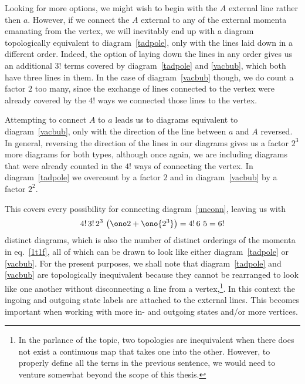 Looking for more options, we might wish to begin with the $A$ external line rather then $a$. However, if we connect the $A$ external to any of the external momenta emanating from the vertex, we will inevitably end up with a diagram topologically equivalent to diagram~\eqref{tadpole}, only with the lines laid down in a different order. Indeed, the option of laying down the lines in any order gives us an additional $3!$ terms covered by diagram~\eqref{tadpole} and \eqref{vacbub}, which both have three lines in them. In the case of diagram~\eqref{vacbub} though, we do count a factor $2$ too many, since the exchange of lines connected to the vertex were already covered by the $4!$ ways we connected those lines to the vertex.

Attempting to connect $A$ to $a$ leads us to diagrams equivalent to diagram~\eqref{vacbub}, only with the direction of the line between $a$ and $A$ reversed. In general, reversing the direction of the lines in our diagrams gives us a factor $2^3$ more diagrams for both types, although once again, we are including diagrams that were already counted in the $4!$ ways of connecting the vertex. In diagram~\eqref{tadpole} we overcount by a factor $2$ and in diagram~\eqref{vacbub} by a factor $2^2$.

This covers every possibility for connecting diagram~\eqref{unconn}, leaving us with
\[4!\,3!\,2^3\,\left(\ono2+\ono{2^3}\right)=4!\,6\,\,5=6!\]
distinct diagrams, which is also the number of distinct orderings of the momenta in eq.~\eqref{1t1f}, all of which can be drawn to look like either diagram~\eqref{tadpole} or \eqref{vacbub}. For the present purposes, we shall note that diagram~\eqref{tadpole} and \eqref{vacbub} are topologically inequivalent because they cannot be rearranged to look like one another without disconnecting a line from a vertex,\footnote{In the parlance of the topic, two topologies are inequivalent when there does not exist a continuous map that takes one into the other. However, to properly define all the terns in the previous sentence, we would need to venture somewhat beyond the scope of this thesis.}. In this context the ingoing and outgoing state labels are attached to the external lines. This becomes important when working with more in- and outgoing states and/or more vertices.

